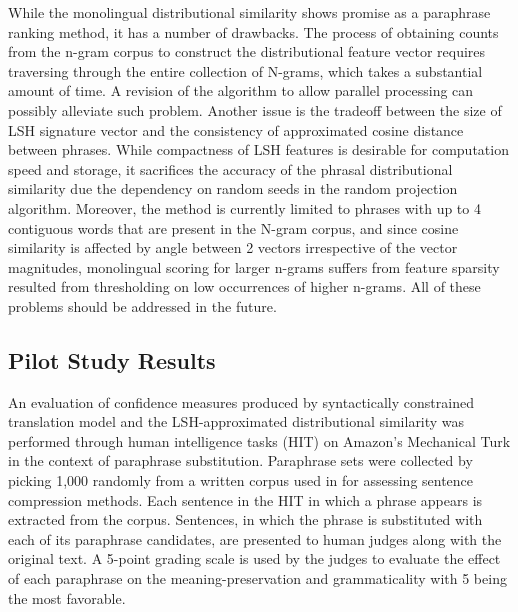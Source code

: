 \documentclass[11pt]{article}
\begin{document}
While the monolingual distributional similarity shows promise as a paraphrase ranking method, it has a number of drawbacks. The process of obtaining counts from the n-gram corpus to construct the distributional feature vector requires traversing through the entire collection of N-grams, which takes a substantial amount of time. A revision of the algorithm to allow parallel processing can possibly alleviate such problem. Another issue is the tradeoff between the size of LSH signature vector and the consistency of approximated cosine distance between phrases. While compactness of LSH features is desirable for computation speed and storage, it sacrifices the accuracy of the phrasal distributional similarity due the dependency on random seeds in the random projection algorithm. Moreover, the method is currently limited to phrases with up to 4 contiguous words that are present in the N-gram corpus, and since cosine similarity is affected by angle between 2 vectors irrespective of the vector magnitudes, monolingual scoring for larger n-grams suffers from feature sparsity resulted from thresholding on low occurrences of higher n-grams. All of these problems should be addressed in the future.






\subsection{Pilot Study Results}

An evaluation of confidence measures produced by syntactically constrained translation model and the LSH-approximated distributional similarity was performed through human intelligence tasks (HIT) on Amazon's Mechanical Turk in the context of paraphrase substitution. Paraphrase sets were collected by picking 1,000 randomly from a written corpus used in  for assessing sentence compression methods. Each sentence in the HIT in which a phrase appears is extracted from the corpus. Sentences, in which the phrase is substituted with each of its paraphrase candidates, are presented to human judges along with the original text. A 5-point grading scale is used by the judges to evaluate the effect of each paraphrase on the meaning-preservation and grammaticality with 5 being the most favorable.
\end{document}
